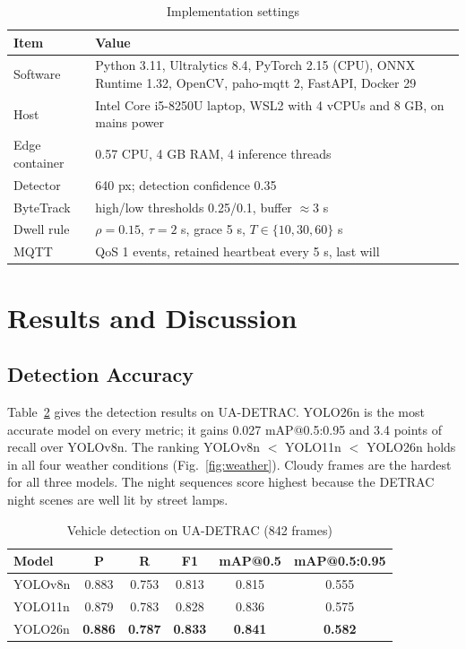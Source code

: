 \documentclass[conference]{IEEEtran}
\begin{document}
\begin{table}[!t]
\caption{Implementation settings}
\label{tab:settings}
\centering
\footnotesize
\begin{tabularx}{\columnwidth}{@{}p{2.3cm}X@{}}
\toprule
Item & Value \\
\midrule
Software & Python 3.11, Ultralytics 8.4, PyTorch 2.15 (CPU), ONNX Runtime 1.32, OpenCV, paho-mqtt 2, FastAPI, Docker 29 \\
Host & Intel Core i5-8250U laptop, WSL2 with 4 vCPUs and 8 GB, on mains power \\
Edge container & 0.57 CPU, 4 GB RAM, 4 inference threads \\
Detector & 640 px; detection confidence 0.35 \\
ByteTrack & high/low thresholds 0.25/0.1, buffer $\approx$3 s \\
Dwell rule & $\rho = 0.15$, $\tau = 2$ s, grace 5 s, $T \in \{10, 30, 60\}$ s \\
MQTT & QoS 1 events, retained heartbeat every 5 s, last will \\
\bottomrule
\end{tabularx}
\end{table}

\section{Results and Discussion}
\label{sec:results}
\subsection{Detection Accuracy}
Table~\ref{tab:detrac} gives the detection results on UA-DETRAC. YOLO26n is the most accurate model on every metric; it gains 0.027 mAP@0.5:0.95 and 3.4 points of recall over YOLOv8n. The ranking YOLOv8n $<$ YOLO11n $<$ YOLO26n holds in all four weather conditions (Fig.~\ref{fig:weather}). Cloudy frames are the hardest for all three models. The night sequences score highest because the DETRAC night scenes are well lit by street lamps.

\begin{table}[!t]
\caption{Vehicle detection on UA-DETRAC (842 frames)}
\label{tab:detrac}
\centering
\footnotesize
\begin{tabular}{@{}lccccc@{}}
\toprule
Model & P & R & F1 & mAP@0.5 & mAP@0.5:0.95 \\
\midrule
YOLOv8n & 0.883 & 0.753 & 0.813 & 0.815 & 0.555 \\
YOLO11n & 0.879 & 0.783 & 0.828 & 0.836 & 0.575 \\
YOLO26n & \textbf{0.886} & \textbf{0.787} & \textbf{0.833} & \textbf{0.841} & \textbf{0.582} \\
\bottomrule
\end{tabular}
\end{table}
\end{document}
